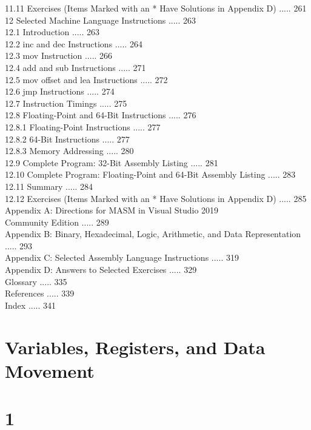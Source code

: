 \documentclass[10pt]{article}
\begin{document}
11.11 Exercises (Items Marked with an * Have Solutions in Appendix D) ..... 261\\
12 Selected Machine Language Instructions ..... 263\\
12.1 Introduction ..... 263\\
12.2 inc and dec Instructions ..... 264\\
12.3 mov Instruction ..... 266\\
12.4 add and sub Instructions ..... 271\\
12.5 mov offset and lea Instructions ..... 272\\
12.6 jmp Instructions ..... 274\\
12.7 Instruction Timings ..... 275\\
12.8 Floating-Point and 64-Bit Instructions ..... 276\\
12.8.1 Floating-Point Instructions ..... 277\\
12.8.2 64-Bit Instructions ..... 277\\
12.8.3 Memory Addressing ..... 280\\
12.9 Complete Program: 32-Bit Assembly Listing ..... 281\\
12.10 Complete Program: Floating-Point and 64-Bit Assembly Listing ..... 283\\
12.11 Summary ..... 284\\
12.12 Exercises (Items Marked with an * Have Solutions in Appendix D) ..... 285\\
Appendix A: Directions for MASM in Visual Studio 2019\\
Community Edition ..... 289\\
Appendix B: Binary, Hexadecimal, Logic, Arithmetic, and Data Representation ..... 293\\
Appendix C: Selected Assembly Language Instructions ..... 319\\
Appendix D: Answers to Selected Exercises ..... 329\\
Glossary ..... 335\\
References ..... 339\\
Index ..... 341

\section*{Variables, Registers, and Data Movement}
\section*{1}
\end{document}
